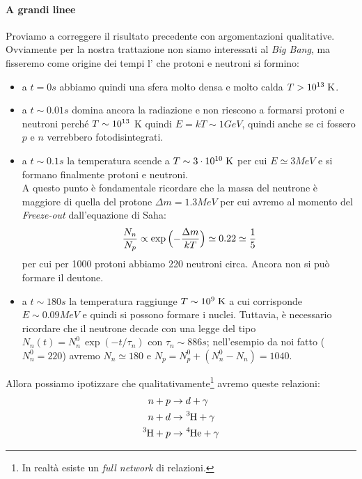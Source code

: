 \paragraph{A grandi linee}\label{a.grandi.linee} Proviamo a correggere il risultato precedente con argomentazioni qualitative. Ovviamente per la nostra trattazione non siamo interessati al \textit{Big Bang}, ma fisseremo come origine dei tempi l' che protoni e neutroni si formino: 
\begin{itemize}
    \item a $t=0\unit{s}$ abbiamo quindi una sfera molto densa e molto calda $T>10^{13}\;\mbox{K}$.  
    \item a $t\sim 0.01\unit{s}$ domina ancora la radiazione e non riescono a formarsi protoni e neutroni perché $T\sim10^{13}$ K quindi $E=kT\sim 1\unit{GeV}$, quindi anche se ci fossero $p$ e $n$ verrebbero fotodisintegrati.
    \item a $t\sim 0.1\unit{s}$ la temperatura scende a $T\sim 3\cdot10^{10}\;\mbox{K}$ per cui $E\simeq 3\unit{MeV}$ e si formano finalmente protoni e neutroni.\\ 
    A questo punto è fondamentale ricordare che la massa del neutrone è maggiore di quella del protone $\Delta m = 1.3\unit{MeV}$ per cui avremo al momento del \textit{Freeze-out} dall'equazione di Saha:
    $$\frac{N_n}{N_p}\propto \exp{\Bigl ( -\frac{\Delta m}{kT} \Bigr )} \simeq 0.22 \simeq \frac{1}{5}$$
    per cui per 1000 protoni abbiamo 220 neutroni circa. Ancora non si può formare il deutone.
    \item a $t\sim 180\unit{s}$ la temperatura raggiunge $T\sim 10^{9}\;\mbox{K}$ a cui corrisponde $E\sim 0.09\unit{MeV}$ e quindi si possono formare i nuclei. Tuttavia, è necessario ricordare che il neutrone decade con una legge del tipo $N_n(t) = N_n^0 \, \exp{(-t/\tau_n)}$ con $\tau_n \sim 886\unit{s}$; nell'esempio da noi fatto ($N_n^0= 220$) avremo $N_n \simeq 180$ e $N_p = N_p^0 + (N_n^0-N_n) = 1040$.
\end{itemize}
\noindent Allora possiamo ipotizzare che qualitativamente\footnote{In realtà esiste un \textit{full network} di relazioni.} avremo queste relazioni:
\begin{displaymath}
\begin{aligned}
n + p &\to d + \gamma \\
n + d &\to \ce{^3H} + \gamma \\
\ce{^3H} + p &\to \ce{^4He} + \gamma
\end{aligned}
\end{displaymath}
